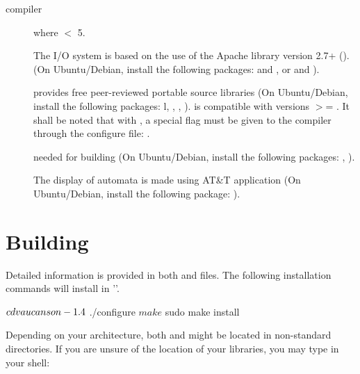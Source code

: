 \begin{description}
\item[\Cpp compiler]  where  $<$ 5.

\item[\XML] The \XML I/O system is based on the use of the Apache 
  \Cpp library version 2.7+ (). (On
  Ubuntu/Debian, install the following packages:  and
  , or  and ).
%

\item[]  provides free peer-reviewed
portable \Cpp source
  libraries (On Ubuntu/Debian, install the following packages:
  l, , ,
  ).
  \vcsn is compatible with  versions $>$= . It shall be
  noted that with , a special flag must be given to the
  compiler through the configure file:
  .
%

\item[] needed for building \tafkit  (On Ubuntu/Debian, install
  the following packages: , ).
%

\item[] The display of automata is made using AT\&T 
  application (On Ubuntu/Debian, install the following package: ).
%

\end{description}

\section{Building \vcsn}
\label{sec:bui-ld}%


Detailed information is provided in both  and 
files. The following installation commands will install \vcsn in
''.

\begin{shell}
$ cd vaucanson-1.4
$ ./configure
$ make
$ sudo make install
\end{shell}%


Depending on your architecture, both  and  might be located
in non-standard directories. If you are unsure of the location of your
libraries, you may type in your shell:

